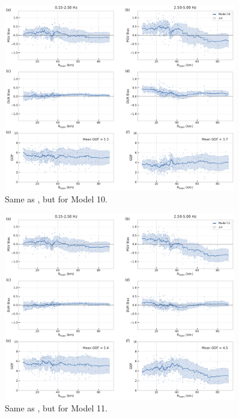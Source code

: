 \begin{figure}[!ht]
  \centering
  \includegraphics[width=0.9\textwidth,height=0.9\textheight,keepaspectratio]{figures/figure_highf_S20.pdf}
  \caption{Same as , but for Model 10.
  }
\label{fig:highf-A20}
\end{figure}
\clearpage


\begin{figure}[!ht]
  \centering
  \includegraphics[width=0.9\textwidth,height=0.9\textheight,keepaspectratio]{figures/figure_highf_S21.pdf}
  \caption{Same as , but for Model 11.
  }
\label{fig:highf-A21}
\end{figure}
\clearpage


